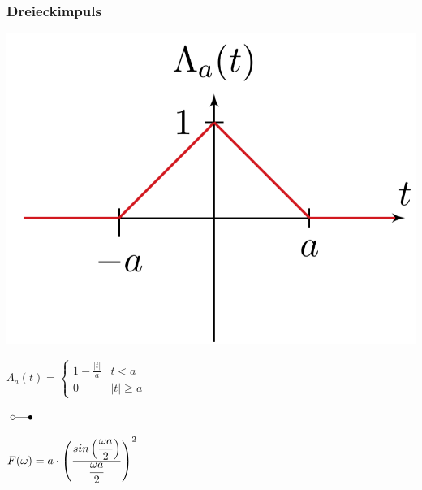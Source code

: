 		\subsubsection{Dreieckimpuls}
			\begin{minipage}{0.2\textwidth}
				\includegraphics[width=\textwidth]{./bilder/funktionen/dreieckF.png}
			\end{minipage}
			\qquad
			\begin{minipage}{0.3\textwidth}
				$\Lambda_{a}(t)=\begin{cases}{1-\frac{|t|}{a}} & {t<a} 					\\ {0} & {|t| \geq a}
				\end{cases}$
			\end{minipage}$\; \laplace \quad $
			\begin{minipage}{0.3\textwidth}						
			$
    		F(\omega)= a \cdot \left(\dfrac{sin\left(\dfrac{\omega a}{2}\right)}				{\dfrac{\omega a}{2}}\right)^{2} \\
  			$
			\end{minipage}
		
		
